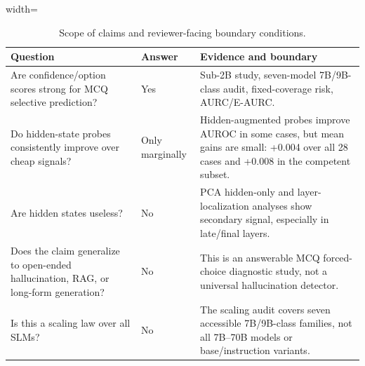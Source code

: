 \begin{table}[t]
\centering
\small
\caption{Scope of claims and reviewer-facing boundary conditions.}
\label{tab:scope}
\begin{threeparttable}

\begin{adjustbox}{width=\textwidth}
\begin{tabular}{p{}p{}p{}}
\toprule
Question & Answer & Evidence and boundary \\
\midrule
Are confidence/option scores strong for MCQ selective prediction? & Yes & Sub-2B study, seven-model 7B/9B-class audit, fixed-coverage risk, AURC/E-AURC. \\
Do hidden-state probes consistently improve over cheap signals? & Only marginally & Hidden-augmented probes improve AUROC in some cases, but mean gains are small: +0.004 over all 28 cases and +0.008 in the competent subset. \\
Are hidden states useless? & No & PCA hidden-only and layer-localization analyses show secondary signal, especially in late/final layers. \\
Does the claim generalize to open-ended hallucination, RAG, or long-form generation? & No & This is an answerable MCQ forced-choice diagnostic study, not a universal hallucination detector. \\
Is this a scaling law over all SLMs? & No & The scaling audit covers seven accessible 7B/9B-class families, not all 7B--70B models or base/instruction variants. \\
\bottomrule
\end{tabular}
\end{adjustbox}

\end{threeparttable}
\end{table}
